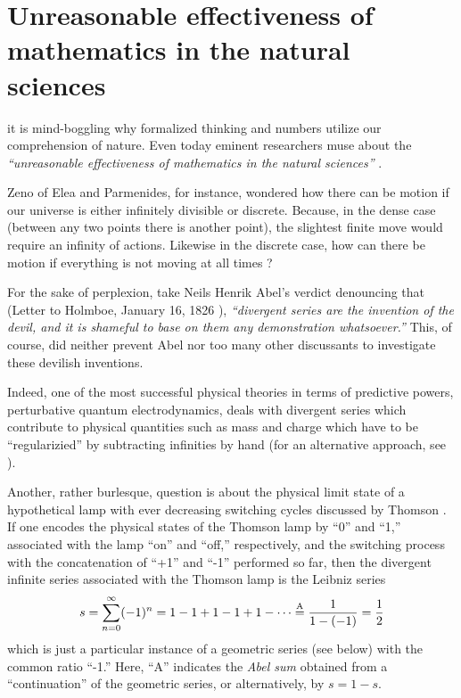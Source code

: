 \chapter{Unreasonable effectiveness of mathematics in the natural sciences}
\label{ch:uens}

 it is mind-boggling why formalized thinking and numbers utilize our comprehension
of nature.
Even today eminent researchers muse about the {\em
``unreasonable effectiveness of mathematics in the natural sciences''} \cite{wigner}.



Zeno of Elea and Parmenides, for instance, wondered how there can be motion if
our universe is either infinitely divisible or discrete.
Because, in the dense case (between any two points there is another point),
the slightest finite move would require an infinity of actions.
Likewise in the discrete case,
how can there be motion if everything is not moving at all times \cite{zeno,benna:62,gruenbaum:68,Sainsbury}?


For the sake of perplexion, take
Neils Henrik Abel's verdict denouncing that
(Letter to Holmboe, January 16, 1826 \cite{Hardy:1949}),
{\em ``divergent series are the invention of the devil, and it is shameful to base on them any demonstration whatsoever.''}
This, of course, did neither prevent Abel nor too many other discussants to investigate these devilish inventions.


Indeed, one of the most successful physical theories in terms of predictive powers,
perturbative quantum electrodynamics,
deals with divergent series \cite{PhysRev.85.631}
which contribute to physical quantities such as mass and charge
which have to be ``regularizied'' by subtracting infinities by hand
(for an alternative approach, see \cite{scharf-finiteQED}).

Another, rather burlesque, question is
about the physical limit state of a hypothetical lamp with ever decreasing switching cycles
discussed by Thomson \cite{thom:54}.
If one encodes the physical states of the Thomson lamp by ``0'' and ``1,''
associated with the lamp ``on'' and ``off,'' respectively,
and the switching process with the concatenation of ``+1'' and ``-1'' performed so far, then
the divergent infinite series associated with the Thomson lamp is
the Leibniz series
\begin{equation}
s = \sum_{n=0}^\infty (-1)^n=1-1+1-1+1-\cdots \stackrel{{\rm A}}{=} \frac{1}{1-(-1)}= \frac{1}{2}
\label{2009-fiftyfifty-1}
\end{equation}
which is just a particular instance of a geometric series (see below) with the common ratio ``-1.''
Here, ``A'' indicates the
{\em  Abel sum}
\cite{Hardy:1949} obtained from a ``continuation'' of the geometric series, or alternatively, by
$s= 1-s$.

